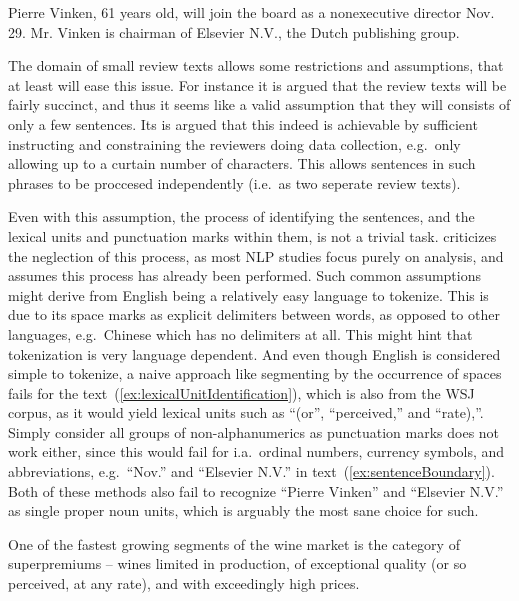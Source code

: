 \begin{numquote}
  Pierre Vinken, 61 years old, will join the board as a nonexecutive director Nov. 29. Mr. Vinken is chairman of Elsevier N.V., the Dutch publishing group.  
  \label{ex:sentenceBoundary}
\end{numquote}

The domain of small review texts allows some restrictions and assumptions, that at least will ease this issue. For instance it is argued that the review texts will be fairly succinct, and thus it seems like a valid assumption that they will consists of only a few sentences. Its is argued that this indeed is achievable by sufficient instructing and constraining the reviewers doing data collection, e.g.\ only allowing up to a curtain number of characters. This allows sentences in such phrases to be proccesed independently (i.e.\ as two seperate review texts).

Even with this assumption, the process of identifying the sentences, and the lexical units and punctuation marks within them, is not a trivial task. \citeauthor{tokenization}  criticizes the neglection of this process, as most NLP studies focus purely on analysis, and assumes this process has already been performed. Such common assumptions might derive from English being a relatively easy language to tokenize. This is due to its space marks as explicit delimiters between words, as opposed to other languages, e.g.\ Chinese which has no delimiters at all. This might hint that tokenization is very language dependent. And even though English is considered simple to tokenize, a naive approach like segmenting by the occurrence of spaces fails for the text~(\ref{ex:lexicalUnitIdentification}), which is also from the WSJ corpus, as it would yield lexical units such as ``(or'', ``perceived,'' and ``rate),''. Simply consider all groups of non-alphanumerics as punctuation marks does not work either, since this would fail for i.a.\ ordinal numbers, currency symbols, and abbreviations, e.g.\ ``Nov.'' and ``Elsevier N.V.'' in text~(\ref{ex:sentenceBoundary}). Both of these methods also fail to recognize ``Pierre Vinken'' and ``Elsevier N.V.'' as single proper noun units, which is arguably the most sane choice for such. 

\begin{numquote}
One of the fastest growing segments of the wine market is the category of superpremiums -- wines limited in production, of exceptional quality (or so perceived, at any rate), and with exceedingly high prices.
  \label{ex:lexicalUnitIdentification}
\end{numquote}
\clearpage

